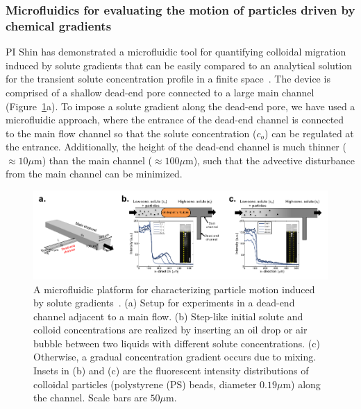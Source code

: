 \documentclass[11pt]{article}
\begin{document}
\subsubsection{Microfluidics for evaluating the motion of particles
driven by chemical gradients}
\label{subsubsec:microfluidics}
PI Shin has demonstrated a microfluidic tool for quantifying colloidal
migration induced by solute gradients that can be easily compared to an
analytical solution for the transient solute concentration profile in a
finite space~\cite{shin2016,shin2017a,shin2017b}. The device is
comprised of a shallow dead-end pore connected to a large main channel
(Figure~\ref{fig:fig3}a).  To impose a solute gradient along the
dead-end pore, we have used a microfluidic approach, where the entrance
of the dead-end channel is connected to the main flow channel so that
the solute concentration ($c_o$) can be regulated at the entrance.
Additionally, the height of the dead-end channel is much thinner
($\approx 10 \mu$m) than the main channel ($\approx 100 \mu$m), such
that the advective disturbance from the main channel can be minimized.
%
\begin{figure}[h]
\begin{center}
\includegraphics*[keepaspectratio=true,scale=1]{figs/fig3.pdf}
\caption{\label{fig:fig3} A microfluidic platform for characterizing
  particle motion induced by solute gradients~\cite{shin2016,
  shin2017a}. (a) Setup for experiments in a dead-end channel adjacent
  to a main flow. (b) Step-like initial solute and colloid
  concentrations are realized by inserting an oil drop or air bubble
  between two liquids with different solute concentrations. (c)
  Otherwise, a gradual concentration gradient occurs due to mixing.
  Insets in (b) and (c) are the fluorescent intensity distributions of
  colloidal particles (polystyrene (PS) beads, diameter $0.19 \mu$m)
  along the channel. Scale bars are $50 \mu$m.}
\end{center}
\end{figure}
\end{document}
